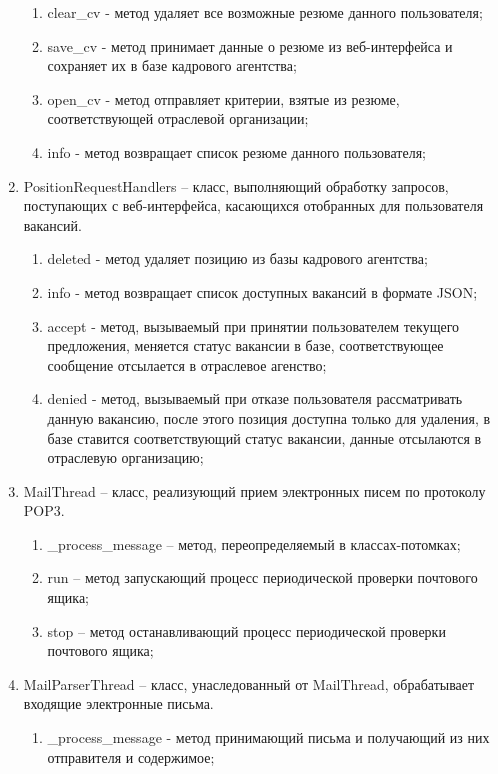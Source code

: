 \begin{enumerate}
	\begin{enumerate}
	\item clear_cv - метод удаляет все возможные резюме данного пользователя;
	\item save_cv - метод принимает данные о резюме из веб-интерфейса и сохраняет их в базе кадрового агентства;	
	\item open_cv - метод отправляет критерии, взятые из резюме, соответствующей отраслевой организации;
	\item info - метод возвращает список резюме данного пользователя;
	\end{enumerate}
\item PositionRequestHandlers – класс, выполняющий обработку запросов, поступающих с веб-интерфейса, касающихся отобранных для пользователя вакансий.
	\begin{enumerate}
	\item deleted - метод удаляет позицию из базы кадрового агентства;         
	\item info - метод возвращает список доступных вакансий в формате JSON;    
	\item accept - метод, вызываемый при принятии пользователем текущего предложения, меняется статус вакансии в базе, соответствующее сообщение отсылается в отраслевое агенство;         
	\item denied - метод, вызываемый при отказе пользователя рассматривать данную вакансию, после этого позиция доступна только для удаления, в базе ставится соответствующий статус вакансии, данные отсылаются в отраслевую организацию;         
	\end{enumerate}
\item MailThread – класс, реализующий прием электронных писем по протоколу POP3.
	\begin{enumerate}
	\item _process_message – метод, переопределяемый в классах-потомках;                                                                   
	\item run – метод запускающий процесс периодической проверки почтового ящика;
	\item stop – метод останавливающий процесс периодической проверки почтового ящика;
	\end{enumerate}
\item MailParserThread – класс, унаследованный от MailThread, обрабатывает входящие электронные письма.
	\begin{enumerate}
	\item _process_message - метод принимающий письма и получающий из них отправителя и содержимое;     

\end{enumerate}
\end{enumerate}
